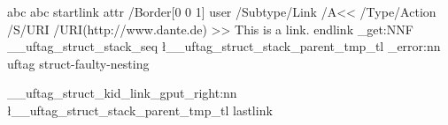 \documentclass{article}
\begin{document}
\leavevmode
{}
abc
\tagmcend
{}
abc
\tagmcend
{}
\pdfextension startlink
    attr {/Border[0 0 1]}
    user{
        /Subtype/Link%
        /A<<%
         /Type/Action%
         /S/URI%
         /URI(http://www.dante.de)%
         >>}
    This is a link.
\pdfextension endlink%
\ExplSyntaxOn
\seq_get:NNF
    \g__uftag_struct_stack_seq
    \l__uftag_struct_stack_parent_tmp_tl
    {
     \msg_error:nn { uftag } { struct-faulty-nesting }
    }
      
\__uftag_struct_kid_link_gput_right:nn { \l__uftag_struct_stack_parent_tmp_tl }
 {\pdffeedback lastlink}

\ExplSyntaxOff
\tagmcend
\tagstructend
\tagstructend
\tagstructend
\end{document}
